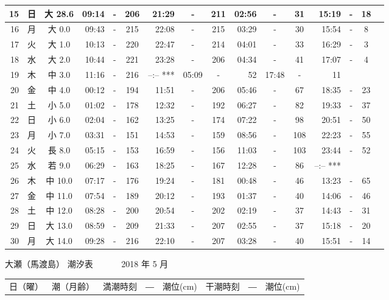 \documentclass[12pt.a4j]{jsarticle}
\begin{document}
\begin{center}
\begin{table}[ht]
\begin{tabular}{|rc|cr|ccrccr|ccrccr|}
\hline
15 & 日 & 大 28.6 & 09:14 &-& 206 & 21:29 &-& 211 & 02:56 &-&  31 & 15:19 &-&  18 \\
\hline
16 & 月 & 大  0.0 & 09:43 &-& 215 & 22:08 &-& 215 & 03:29 &-&  30 & 15:54 &-&   8 \\
\hline
17 & 火 & 大  1.0 & 10:13 &-& 220 & 22:47 &-& 214 & 04:01 &-&  33 & 16:29 &-&   3 \\
\hline
18 & 水 & 大  2.0 & 10:44 &-& 221 & 23:28 &-& 206 & 04:34 &-&  41 & 17:07 &-&   4 \\
\hline
19 & 木 & 中  3.0 & 11:16 &-& 216 & --:--   *** & 05:09 &-&  52 & 17:48 &-&  11 \\
\hline
20 & 金 & 中  4.0 & 00:12 &-& 194 & 11:51 &-& 206 & 05:46 &-&  67 & 18:35 &-&  23 \\
\hline
21 & 土 & 小  5.0 & 01:02 &-& 178 & 12:32 &-& 192 & 06:27 &-&  82 & 19:33 &-&  37 \\
\hline
22 & 日 & 小  6.0 & 02:04 &-& 162 & 13:25 &-& 174 & 07:22 &-&  98 & 20:51 &-&  50 \\
\hline
23 & 月 & 小  7.0 & 03:31 &-& 151 & 14:53 &-& 159 & 08:56 &-& 108 & 22:23 &-&  55 \\
\hline
24 & 火 & 長  8.0 & 05:15 &-& 153 & 16:59 &-& 156 & 11:03 &-& 103 & 23:44 &-&  52 \\
\hline
25 & 水 & 若  9.0 & 06:29 &-& 163 & 18:25 &-& 167 & 12:28 &-&  86 & --:--   *** \\
\hline
26 & 木 & 中 10.0 & 07:17 &-& 176 & 19:24 &-& 181 & 00:48 &-&  46 & 13:23 &-&  65 \\
\hline
27 & 金 & 中 11.0 & 07:54 &-& 189 & 20:12 &-& 193 & 01:37 &-&  40 & 14:06 &-&  46 \\
\hline
28 & 土 & 中 12.0 & 08:28 &-& 200 & 20:54 &-& 202 & 02:19 &-&  37 & 14:43 &-&  31 \\
\hline
29 & 日 & 大 13.0 & 08:59 &-& 209 & 21:33 &-& 207 & 02:55 &-&  37 & 15:18 &-&  20 \\
\hline
30 & 月 & 大 14.0 & 09:28 &-& 216 & 22:10 &-& 207 & 03:28 &-&  40 & 15:51 &-&  14 \\
\hline
\end{tabular}
\end{table}
\newpage
 {\LARGE 大瀬（馬渡島）  潮汐表　　　}
 {\large 2018 年  5 月}\\
 \begin{table}[ht]
 \begin{tabular}{|rc|cr|ccrccr|ccrccr|}
 \hline
 \multicolumn{2}{|c|}{日（曜）} & \multicolumn{2}{c|}{潮（月齢）} & \multicolumn{6}{c|}{満潮時刻　―　潮位(cm)} & \multicolumn{6}{c|}{干潮時刻　―　潮位(cm)} \\

\end{tabular}
\end{table}
\end{center}
\end{document}
